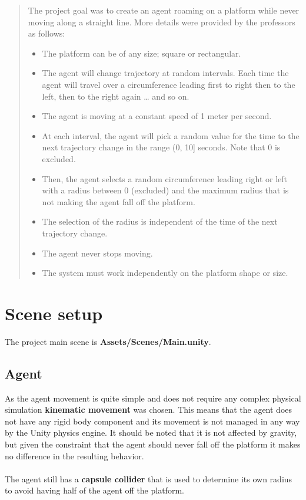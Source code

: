 \documentclass[12pt, a4paper]{article}
\begin{document}
\begin{abstract}
\noindent The project goal was to create an agent roaming on a platform while never moving along a straight line. More details were provided by the professors as follows:
\begin{itemize}
\item The platform can be of any size; square or rectangular.
\item The agent will change trajectory at random intervals. Each time the agent will travel over a
circumference leading first to right then to the left, then to the right again … and so on.
\item The agent is moving at a constant speed of 1 meter per second.
\item At each interval, the agent will pick a random value for the time to the next trajectory change
in the range (0, 10] seconds. Note that 0 is excluded.
\item Then, the agent selects a random circumference leading right or left with a radius between 0
(excluded) and the maximum radius that is not making the agent fall off the platform.
\item The selection of the radius is independent of the time of the next trajectory change.
\item The agent never stops moving.
\item The system must work independently on the platform shape or size.
\end{itemize}
\end{abstract}

\section{Scene setup}
The project main scene is \textbf{Assets/Scenes/Main.unity}.
\subsection{Agent}
As the agent movement is quite simple and does not require any complex physical simulation \textbf{kinematic movement} was chosen. This means that the agent does not have any rigid body component and its movement is not managed
in any way by the Unity physics engine.
It should be noted that it is not affected by gravity, but given the constraint that the agent should never fall off the platform it makes no difference in the resulting behavior.\\\\
The agent still has a \textbf{capsule collider} that is used to determine its own radius to avoid having half of the agent off the platform.
\end{document}
